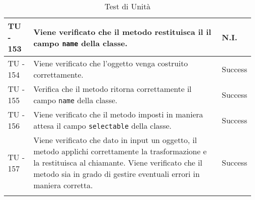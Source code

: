 \begin{center}
\begin{longtable}{ | p{3cm} | p{9cm} | p{2cm} | }
TU - 153 & Viene verificato che il metodo restituisca il  il campo \texttt{name} della classe. & N.I. \\ \hline
TU - 154 & Viene verificato che l'oggetto venga costruito correttamente. & Success \\ \hline
TU - 155 & Verifica che il metodo ritorna correttamente il campo \texttt{name} della classe. & Success \\ \hline
TU - 156 & Viene verificato che il metodo imposti in maniera attesa il campo \texttt{selectable} della classe.  & Success \\ \hline
TU - 157 & Viene verificato che dato in input un oggetto, il metodo applichi correttamente la trasformazione e la restituisca al chiamante.
Viene verificato che il metodo sia in grado di gestire eventuali errori in maniera corretta. & Success \\ \hline
\caption{Test di Unità}
\end{longtable}
\egroup
\end{center}
